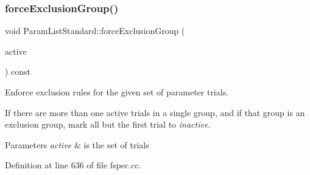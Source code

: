 \subsubsection{\texorpdfstring{forceExclusionGroup()}{forceExclusionGroup()}}
{\footnotesize\ttfamily void Param\+List\+Standard\+::force\+Exclusion\+Group (\begin{DoxyParamCaption}\item[{\mbox{\hyperlink{class_param_active}{Param\+Active}} $\ast$}]{active }\end{DoxyParamCaption}) const\hspace{0.3cm}{\ttfamily [protected]}}



Enforce exclusion rules for the given set of parameter trials. 

If there are more than one active trials in a single group, and if that group is an exclusion group, mark all but the first trial to {\itshape inactive}. 
\begin{DoxyParams}{Parameters}
{\em active} & is the set of trials \\
\hline
\end{DoxyParams}


Definition at line 636 of file fspec.\+cc.

